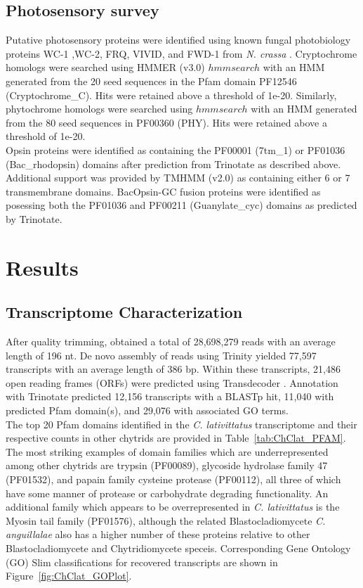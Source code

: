 \subsection*{Photosensory survey}
Putative photosensory proteins were identified using known fungal photobiology proteins WC-1 ,WC-2, FRQ, VIVID, and FWD-1 from \textit{N. crassa} \cite{Borkovich2004}. Cryptochrome homologs were searched using HMMER (v3.0) $hmmsearch$ with an HMM generated from the 20 seed sequences in the Pfam domain PF12546 (Cryptochrome\_C). Hits were retained above a threshold of 1e-20. Similarly, phytochrome homologs were searched using $hmmsearch$ with an HMM generated from the 80 seed sequences in PF00360 (PHY). Hits were retained above a threshold of 1e-20. \\
\indent Opsin proteins were identified as containing the PF00001 (7tm\_1) or PF01036 (Bac\_rhodopsin) domains after prediction from Trinotate as described above. Additional support was provided by TMHMM (v2.0) as containing either 6 or 7 transmembrane domains. BacOpsin-GC fusion proteins were identified as posessing both the PF01036 and PF00211 (Guanylate\_cyc) domains as predicted by Trinotate.\\

\section{Results}

\subsection*{Transcriptome Characterization}
After quality trimming, obtained a total of 28,698,279 reads with an average length of 196 nt. De novo assembly of reads using Trinity \cite{Grabherr2011} yielded 77,597 transcripts with an average length of 386 bp. Within these transcripts, 21,486 open reading frames (ORFs) were predicted using Transdecoder \cite{Haas2013}. Annotation with Trinotate predicted 12,156 transcripts with a BLASTp hit, 11,040 with predicted Pfam domain(s), and 29,076 with associated GO terms. \\
\indent The top 20 Pfam domains identified in the \textit{C. lativittatus} transcriptome and their respective counts in other chytrids are provided in Table~\ref{tab:ChClat_PFAM}. The most striking examples of domain families which are underrepresented among other chytrids are trypsin (PF00089), glycoside hydrolase family 47 (PF01532), and papain family cysteine protease (PF00112), all three of which have some manner of protease or carbohydrate degrading functionality. An additional family which appears to be overrepresented in \textit{C. lativittatus} is the Myosin tail family (PF01576), although the related Blastocladiomycete \textit{C. anguillalae} also has a higher number of these proteins relative to other Blastocladiomycete and Chytridiomycete speceis. Corresponding Gene Ontology (GO) Slim classifications for recovered transcripts are shown in Figure~\ref{fig:ChClat_GOPlot}. \\

